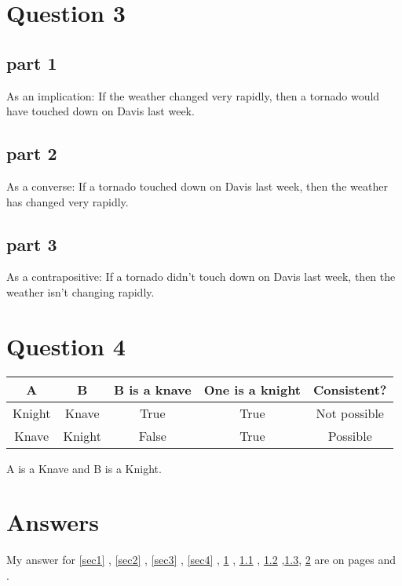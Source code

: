 \documentclass[a4paper,12pt]{article}
\begin{document}
\section{Question 3}
\label{sec5}

\subsection{part 1}
\label{sec6}
As an implication: If the weather changed very rapidly, then a tornado would have touched down on Davis last week.
\subsection{part 2}
\label{sec7}
As a converse: If a tornado touched down on Davis last week, then the weather has changed very rapidly.
\subsection{part 3}
\label{sec9}
As a contrapositive: If a tornado didn't touch down on Davis last week, then the weather isn't changing rapidly.
\section{Question 4}
\label{sec8}

\begin{center}
  \begin{tabular}{ |c|c|c|c|c| }
    \hline
    A & B & B is a knave & One is a knight & Consistent?  \\ \hline
    Knight & Knave & True & True & Not possible  \\ \hline
    Knave & Knight & False & True & Possible  \\ 
    \hline
  \end{tabular}
\end{center}
A is a Knave and B is a Knight.
\section{Answers}
My answer for \ref{sec1} , \ref{sec2} , \ref{sec3} , \ref{sec4} , \ref{sec5} , \ref{sec6} , \ref{sec7} ,\ref{sec9}, \ref{sec8} are on pages \pageref{sec1} and \pageref{sec7}.
\end{document}
